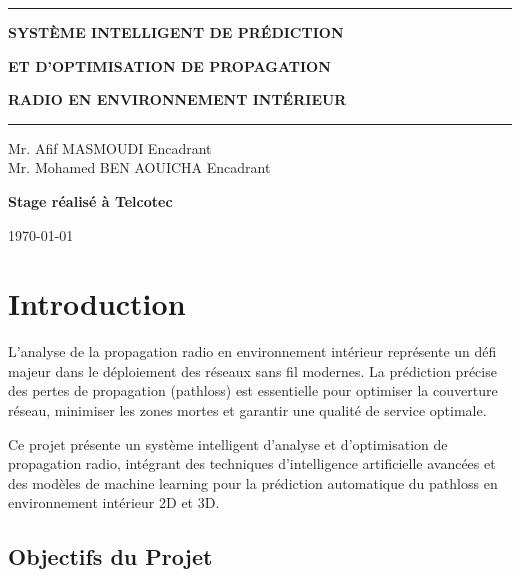 \documentclass[12pt,a4paper]{article}
\begin{document}
\begin{titlepage}
    \vspace{1cm}
    
    \rule{0.8\textwidth}{2pt}
    
    \vspace{0.5cm}
    
    {\Large\textbf{SYSTÈME INTELLIGENT DE PRÉDICTION}}
    
    {\Large\textbf{ET D'OPTIMISATION DE PROPAGATION}}
    
    {\Large\textbf{RADIO EN ENVIRONNEMENT INTÉRIEUR}}
    
    \vspace{0.5cm}
    
    \rule{0.8\textwidth}{2pt}
    
    \vfill
    
    \begin{minipage}[t]{0.5\textwidth}
        \raggedright
        Mr. Afif MASMOUDI \hfill Encadrant\\
        Mr. Mohamed BEN AOUICHA \hfill Encadrant
    \end{minipage}
    
    \vspace{1cm}
    
    \textbf{Stage réalisé à Telcotec}
    
    \vspace{1cm}
    
    {\large\today}
    
\end{titlepage}

\tableofcontents
\newpage

\section{Introduction}

L'analyse de la propagation radio en environnement intérieur représente un défi majeur dans le déploiement des réseaux sans fil modernes. La prédiction précise des pertes de propagation (pathloss) est essentielle pour optimiser la couverture réseau, minimiser les zones mortes et garantir une qualité de service optimale.

Ce projet présente un système intelligent d'analyse et d'optimisation de propagation radio, intégrant des techniques d'intelligence artificielle avancées et des modèles de machine learning pour la prédiction automatique du pathloss en environnement intérieur 2D et 3D.

\subsection{Objectifs du Projet}
\end{document}
